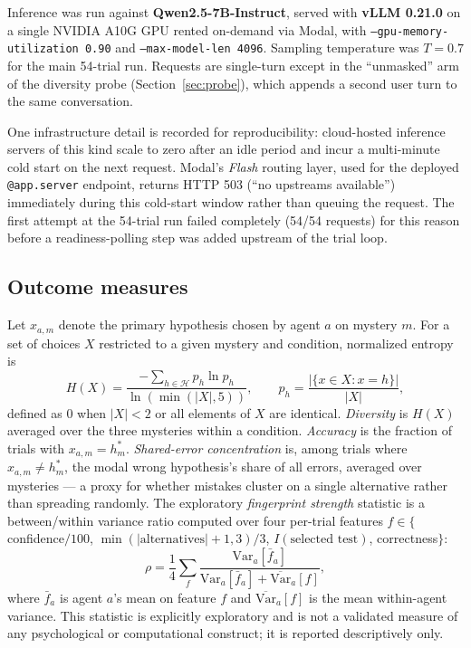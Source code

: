 \documentclass[11pt]{article}
\newcommand{\code}[1]{\texttt{#1}}
\begin{document}
Inference was run against \textbf{Qwen2.5-7B-Instruct}, served with \textbf{vLLM 0.21.0} on a
single NVIDIA A10G GPU rented on-demand via Modal, with \code{--gpu-memory-utilization 0.90} and
\code{--max-model-len 4096}. Sampling temperature was $T=0.7$ for the main 54-trial run.
Requests are single-turn except in the ``unmasked'' arm of the diversity probe
(Section~\ref{sec:probe}), which appends a second user turn to the same conversation.

One infrastructure detail is recorded for reproducibility: cloud-hosted inference servers of this
kind scale to zero after an idle period and incur a multi-minute cold start on the next request.
Modal's \emph{Flash} routing layer, used for the deployed \code{@app.server} endpoint, returns
HTTP 503 (``no upstreams available'') immediately during this cold-start window rather than
queuing the request. The first attempt at the 54-trial run failed completely (54/54 requests) for
this reason before a readiness-polling step was added upstream of the trial loop.

\subsection{Outcome measures}

Let $x_{a,m}$ denote the primary hypothesis chosen by agent $a$ on mystery $m$. For a set of
choices $X$ restricted to a given mystery and condition, normalized entropy is
\begin{equation}
H(X) = \frac{-\sum_{h \in \mathcal{H}} p_h \ln p_h}{\ln(\min(|X|,5))}, \qquad p_h = \frac{|\{x \in X : x = h\}|}{|X|},
\end{equation}
defined as $0$ when $|X|<2$ or all elements of $X$ are identical. \emph{Diversity} is $H(X)$
averaged over the three mysteries within a condition. \emph{Accuracy} is the fraction of trials
with $x_{a,m} = h^\ast_m$. \emph{Shared-error concentration} is, among trials where
$x_{a,m}\neq h^\ast_m$, the modal wrong hypothesis's share of all errors, averaged over mysteries
--- a proxy for whether mistakes cluster on a single alternative rather than spreading randomly.
The exploratory \emph{fingerprint strength} statistic is a between/within variance ratio computed
over four per-trial features $f \in \{$confidence$/100$, $\min(|\text{alternatives}|+1,3)/3$,
$I(\text{selected test})$, correctness$\}$:
\begin{equation}
\rho = \frac{1}{4}\sum_{f} \frac{\mathrm{Var}_a[\bar f_a]}{\mathrm{Var}_a[\bar f_a] + \overline{\mathrm{Var}}_a[f]},
\end{equation}
where $\bar f_a$ is agent $a$'s mean on feature $f$ and $\overline{\mathrm{Var}}_a[f]$ is the mean
within-agent variance. This statistic is explicitly exploratory and is not a validated measure of
any psychological or computational construct; it is reported descriptively only.
\end{document}

